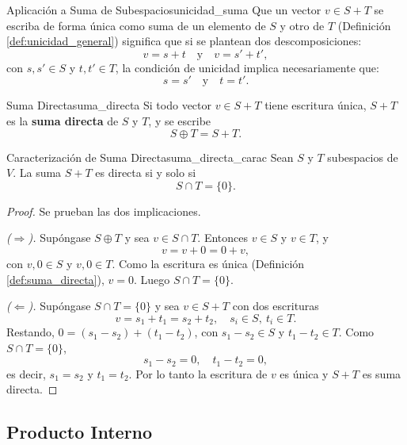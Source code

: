 \documentclass[11pt, a4paper]{article}
\begin{document}
\begin{ejemplo}{Aplicación a Suma de Subespacios}{unicidad_suma}
Que un vector $v \in S+T$ se escriba de forma única como suma de un elemento de $S$ y otro de $T$ (Definición \ref{def:unicidad_general}) significa que si se plantean dos descomposiciones:
\[
v = s + t \quad \text{y} \quad v = s' + t',
\]
con $s, s' \in S$ y $t, t' \in T$, la condición de unicidad implica necesariamente que:
\[
s = s' \quad \text{y} \quad t = t'.
\]
\end{ejemplo}

\begin{definicion}{Suma Directa}{suma_directa}
Si todo vector $v \in S+T$ tiene escritura única, $S+T$ es la \textbf{suma directa} de $S$ y $T$, y se escribe
\[
S \oplus T = S+T.
\]
\end{definicion}

\begin{proposicion}{Caracterización de Suma Directa}{suma_directa_carac}
Sean $S$ y $T$ subespacios de $V$. La suma $S+T$ es directa si y solo si
\[
S \cap T = \{0\}.
\]
\end{proposicion}

\begin{proof}
Se prueban las dos implicaciones.

\textit{($\Rightarrow$).} Supóngase $S \oplus T$ y sea $v \in S \cap T$. Entonces $v \in S$ y $v \in T$, y
\[
v = v + 0 = 0 + v,
\]
con $v, 0 \in S$ y $v, 0 \in T$. Como la escritura es única (Definición \ref{def:suma_directa}), $v = 0$. Luego $S \cap T = \{0\}$.

\textit{($\Leftarrow$).} Supóngase $S \cap T = \{0\}$ y sea $v \in S+T$ con dos escrituras
\[
v = s_1 + t_1 = s_2 + t_2, \quad s_i \in S, \ t_i \in T.
\]
Restando, $0 = (s_1 - s_2) + (t_1 - t_2)$, con $s_1 - s_2 \in S$ y $t_1 - t_2 \in T$. Como $S \cap T = \{0\}$,
\[
s_1 - s_2 = 0, \quad t_1 - t_2 = 0,
\]
es decir, $s_1 = s_2$ y $t_1 = t_2$. Por lo tanto la escritura de $v$ es única y $S+T$ es suma directa.
\end{proof}

\subsection{Producto Interno}
\end{document}
